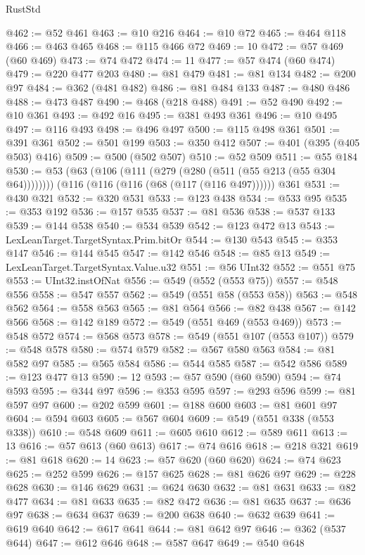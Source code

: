 \begin{lexlean}{RustStd}
\begin{coremodule}
@462 := @52 @461
@463 := @10 @216
@464 := @10 @72
@465 := @464 @118
@466 := @463 @465
@468 := @115 @466 @72
@469 := 10
@472 := @57 @469 (@60 @469)
@473 := @74 @472
@474 := 11
@477 := @57 @474 (@60 @474)
@479 := @220 @477 @203
@480 := @81 @479
@481 := @81 @134
@482 := @200 @97
@484 := @362 (@481 @482)
@486 := @81 @484 @133
@487 := @480 @486
@488 := @473 @487
@490 := @468 (@218 @488)
@491 := @52 @490
@492 := @10 @361
@493 := @492 @16
@495 := @381 @493 @361
@496 := @10 @495
@497 := @116 @493
@498 := @496 @497
@500 := @115 @498 @361
@501 := @391 @361
@502 := @501 @199
@503 := @350 @412
@507 := @401 (@395 (@405 @503) @416)
@509 := @500 (@502 @507)
@510 := @52 @509
@511 := @55 @184
@530 := @53
    (@63 (@106 (@111 (@279 (@280 (@511 (@55 @213 (@55 @304 @64))))))))
    (@116 (@116 (@116 (@68 (@117 (@116 @497))))))
    @361
@531 := @430 @321
@532 := @320 @531
@533 := @123 @438
@534 := @533 @95
@535 := @353 @192
@536 := @157 @535
@537 := @81 @536
@538 := @537 @133
@539 := @144 @538
@540 := @534 @539
@542 := @123 @472 @13
@543 := LexLeanTarget.TargetSyntax.Prim.bitOr
@544 := @130 @543
@545 := @353 @147
@546 := @144 @545
@547 := @142 @546
@548 := @85 @13
@549 := LexLeanTarget.TargetSyntax.Value.u32
@551 := @56 UInt32
@552 := @551 @75
@553 := UInt32.instOfNat
@556 := @549 (@552 (@553 @75))
@557 := @548 @556
@558 := @547 @557
@562 := @549 (@551 @58 (@553 @58))
@563 := @548 @562
@564 := @558 @563
@565 := @81 @564
@566 := @82 @438
@567 := @142 @566
@568 := @142 @189
@572 := @549 (@551 @469 (@553 @469))
@573 := @548 @572
@574 := @568 @573
@578 := @549 (@551 @107 (@553 @107))
@579 := @548 @578
@580 := @574 @579
@582 := @567 @580 @563
@584 := @81 @582 @97
@585 := @565 @584
@586 := @544 @585
@587 := @542 @586
@589 := @123 @477 @13
@590 := 12
@593 := @57 @590 (@60 @590)
@594 := @74 @593
@595 := @344 @97
@596 := @353 @595
@597 := @293 @596
@599 := @81 @597 @97
@600 := @202 @599
@601 := @188 @600
@603 := @81 @601 @97
@604 := @594 @603
@605 := @567 @604
@609 := @549 (@551 @338 (@553 @338))
@610 := @548 @609
@611 := @605 @610
@612 := @589 @611
@613 := 13
@616 := @57 @613 (@60 @613)
@617 := @74 @616
@618 := @218 @321
@619 := @81 @618
@620 := 14
@623 := @57 @620 (@60 @620)
@624 := @74 @623
@625 := @252 @599
@626 := @157 @625
@628 := @81 @626 @97
@629 := @228 @628
@630 := @146 @629
@631 := @624 @630
@632 := @81 @631
@633 := @82 @477
@634 := @81 @633
@635 := @82 @472
@636 := @81 @635
@637 := @636 @97
@638 := @634 @637
@639 := @200 @638
@640 := @632 @639
@641 := @619 @640
@642 := @617 @641
@644 := @81 @642 @97
@646 := @362 (@537 @644)
@647 := @612 @646
@648 := @587 @647
@649 := @540 @648

\end{coremodule}
\end{lexlean}
